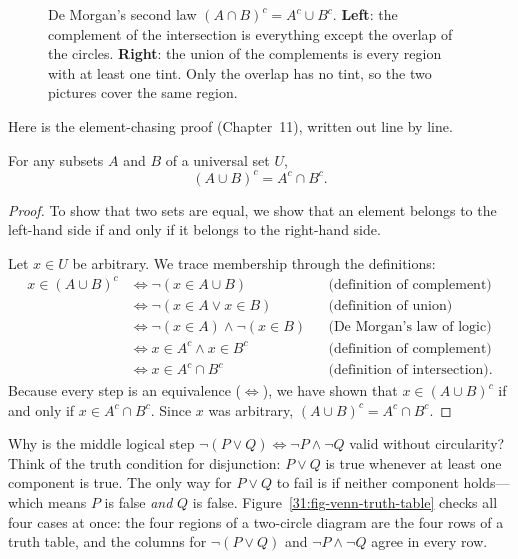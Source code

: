 \begin{figure}[htbp]
\caption{De Morgan's second law $(A \cap B)^c = A^c \cup B^c$. \textbf{Left}: the complement of the intersection is everything except the overlap of the circles. \textbf{Right}: the union of the complements is every region with at least one tint. Only the overlap has no tint, so the two pictures cover the same region.}
\label{31:fig-demorgan-second}
\end{figure}

Here is the element-chasing proof (Chapter~11), written out line by line.

\begin{theorem}
For any subsets $A$ and $B$ of a universal set $U$,
\[
(A \cup B)^c = A^c \cap B^c.
\]
\end{theorem}

\begin{proof}
To show that two sets are equal, we show that an element belongs to the left-hand side if and only if it belongs to the right-hand side.

Let $x \in U$ be arbitrary. We trace membership through the definitions:
\begin{align*}
x \in (A \cup B)^c &\iff \neg(x \in A \cup B) && \text{(definition of complement)} \\
&\iff \neg(x \in A \lor x \in B) && \text{(definition of union)} \\
&\iff \neg(x \in A) \land \neg(x \in B) && \text{(De Morgan's law of logic)} \\
&\iff x \in A^c \land x \in B^c && \text{(definition of complement)} \\
&\iff x \in A^c \cap B^c && \text{(definition of intersection)}.
\end{align*}
Because every step is an equivalence ($\iff$), we have shown that $x \in (A \cup B)^c$ if and only if $x \in A^c \cap B^c$. Since $x$ was arbitrary, $(A \cup B)^c = A^c \cap B^c$.
\end{proof}

Why is the middle logical step $\neg(P \lor Q) \iff \neg P \land \neg Q$ valid without circularity? Think of the truth condition for disjunction: $P \lor Q$ is true whenever at least one component is true. The only way for $P \lor Q$ to fail is if neither component holds---which means $P$ is false \emph{and} $Q$ is false. Figure~\ref{31:fig-venn-truth-table} checks all four cases at once: the four regions of a two-circle diagram are the four rows of a truth table, and the columns for $\neg(P \lor Q)$ and $\neg P \land \neg Q$ agree in every row.

